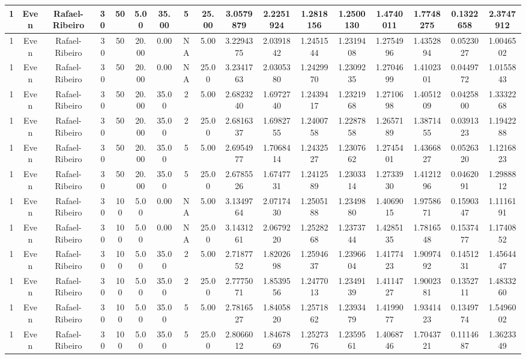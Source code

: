 \begin{longtable}{ | c | c | c | c | c | c | c | c | c | c | c | c | c | c | c | c | c | }
	\hline
	1	&	Even	&	Rafael-Ribeiro	&	30	&	50	&	5.00	&	35.00	&	5	&	25.00	&	3.0579879	&	2.2251924	&	1.2818156	&	1.2500130	&	1.4740011	&	1.7748275	&	0.1322658	&	2.3747912 \\
	\hline
	1	&	Even	&	Rafael-Ribeiro	&	30	&	50	&	20.00	&	0.00	&	NA	&	5.00	&	3.2294375	&	2.0391842	&	1.2451544	&	1.2319408	&	1.2754996	&	1.4352894	&	0.0523027	&	1.0046502 \\
	\hline
	1	&	Even	&	Rafael-Ribeiro	&	30	&	50	&	20.00	&	0.00	&	NA	&	25.00	&	3.2341763	&	2.0305380	&	1.2429970	&	1.2309235	&	1.2704699	&	1.4102301	&	0.0449772	&	1.0155843 \\
	\hline
	1	&	Even	&	Rafael-Ribeiro	&	30	&	50	&	20.00	&	35.00	&	2	&	5.00	&	2.6823240	&	1.6972740	&	1.2439417	&	1.2321968	&	1.2710698	&	1.4051209	&	0.0425800	&	1.3332268 \\
	\hline
	1	&	Even	&	Rafael-Ribeiro	&	30	&	50	&	20.00	&	35.00	&	2	&	25.00	&	2.6816337	&	1.6982755	&	1.2400758	&	1.2287858	&	1.2657189	&	1.3871455	&	0.0391323	&	1.1942288 \\
	\hline
	1	&	Even	&	Rafael-Ribeiro	&	30	&	50	&	20.00	&	35.00	&	5	&	5.00	&	2.6954977	&	1.7068414	&	1.2432527	&	1.2307662	&	1.2745401	&	1.4366827	&	0.0526320	&	1.1216823 \\
	\hline
	1	&	Even	&	Rafael-Ribeiro	&	30	&	50	&	20.00	&	35.00	&	5	&	25.00	&	2.6785526	&	1.6747731	&	1.2412589	&	1.2303314	&	1.2733930	&	1.4121296	&	0.0462091	&	1.2988812 \\
	\hline
	1	&	Even	&	Rafael-Ribeiro	&	30	&	100	&	5.00	&	0.00	&	NA	&	5.00	&	3.1349764	&	2.0717430	&	1.2505188	&	1.2349880	&	1.4069015	&	1.9758671	&	0.1590347	&	1.1116191 \\
	\hline
	1	&	Even	&	Rafael-Ribeiro	&	30	&	100	&	5.00	&	0.00	&	NA	&	25.00	&	3.1431261	&	2.0679220	&	1.2528268	&	1.2373744	&	1.4285135	&	1.7816548	&	0.1537477	&	1.1740852 \\
	\hline
	1	&	Even	&	Rafael-Ribeiro	&	30	&	100	&	5.00	&	35.00	&	2	&	5.00	&	2.7187752	&	1.8202698	&	1.2594637	&	1.2396604	&	1.4177423	&	1.9097492	&	0.1451231	&	1.4564447 \\
	\hline
	1	&	Even	&	Rafael-Ribeiro	&	30	&	100	&	5.00	&	35.00	&	2	&	25.00	&	2.7775071	&	1.8539556	&	1.2477013	&	1.2349139	&	1.4114727	&	1.9002381	&	0.1352711	&	1.4833260 \\
	\hline
	1	&	Even	&	Rafael-Ribeiro	&	30	&	100	&	5.00	&	35.00	&	5	&	5.00	&	2.7816527	&	1.8405820	&	1.2571862	&	1.2393479	&	1.4199077	&	1.9341423	&	0.1349774	&	1.5496002 \\
	\hline
	1	&	Even	&	Rafael-Ribeiro	&	30	&	100	&	5.00	&	35.00	&	5	&	25.00	&	2.8066012	&	1.8467869	&	1.2527376	&	1.2359561	&	1.4068746	&	1.7043721	&	0.1114687	&	1.3623349 \\

\end{longtable}
